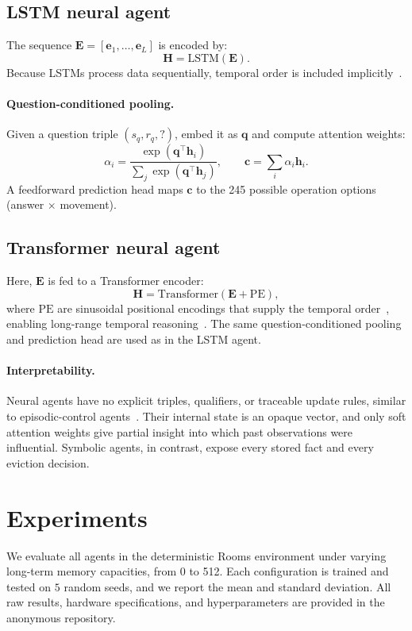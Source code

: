 \documentclass[runningheads]{llncs}
\begin{document}
\subsection*{LSTM neural agent}
The sequence $\mathbf{E}=[\mathbf{e}_1,\dots,\mathbf{e}_L]$ is encoded by:
\[
\mathbf{H} = \text{LSTM}(\mathbf{E}).
\]
Because LSTMs process data sequentially, temporal order is included
implicitly~\cite{6795963}.

\paragraph{Question-conditioned pooling.}
Given a question triple $(s_q,r_q,?)$, embed it as $\mathbf{q}$ and compute
attention weights:
\[
\alpha_i = \frac{\exp(\mathbf{q}^\top \mathbf{h}_i)}
{\sum_j \exp(\mathbf{q}^\top \mathbf{h}_j)},\qquad
\mathbf{c} = \sum_i \alpha_i \mathbf{h}_i.
\]
A feedforward prediction head maps $\mathbf{c}$ to the 245 possible
operation options (answer $\times$ movement).

\subsection*{Transformer neural agent}
Here, $\mathbf{E}$ is fed to a Transformer encoder:
\[
\mathbf{H} = \text{Transformer}(\mathbf{E} + \mathrm{PE}),
\]
where $\mathrm{PE}$ are sinusoidal positional encodings that supply the
temporal order~\cite{vaswani2023attentionneed}, enabling long-range temporal reasoning~\cite{dehghani2019universaltransformers}. The same question-conditioned pooling and prediction head
are used as in the LSTM agent.

\paragraph{Interpretability.}
Neural agents have no explicit triples, qualifiers, or traceable update
rules, similar to episodic-control agents~\cite{pritzel2017neuralepisodiccontrol,blundell2016modelfreeepisodiccontrol}. Their internal state is an opaque vector, and only soft attention
weights give partial insight into which past observations were influential.
Symbolic agents, in contrast, expose every stored fact and every eviction
decision.


\section{Experiments}

We evaluate all agents in the deterministic Rooms environment under varying long-term memory capacities, from 0 to 512. Each configuration is trained and tested on $5$ random seeds, and we report the mean and standard deviation. All raw results, hardware specifications, and hyperparameters are provided in the anonymous repository.
\end{document}
